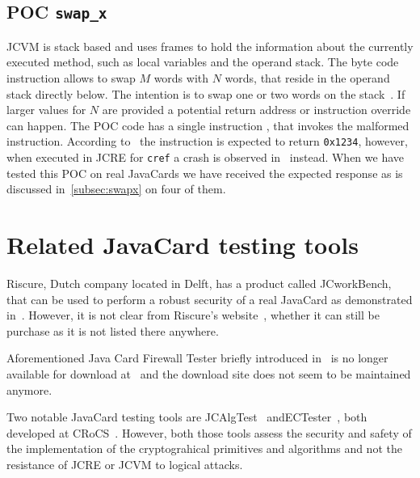 \subsection{POC \texttt{swap_x}}
JCVM is stack based and uses frames to hold the information about the currently executed method, such as local variables and the operand stack. The byte code instruction \swapx allows to swap $M$ words with $N$ words, that reside in the operand stack directly below. The intention is to swap one or two words on the stack~\cite{jcspecs31download}. If larger values for $N$ are provided a potential return address or instruction override can happen.
The POC code has a single instruction \triggerswapx, that invokes the malformed \swapx instruction. According to~\cite{se:oracle:part1} the instruction is expected to return \texttt{0x1234}, however, when executed in JCRE for \texttt{cref} a crash is observed in~\cite{se:oracle:part1} instead. When we have tested this POC on real JavaCards we have received the expected response as is discussed in~\ref{subsec:swapx} on four of them.


\section{Related JavaCard testing tools}
Riscure, Dutch company located in Delft, has a product called JCworkBench, that can be used to perform a robust security of a real JavaCard as demonstrated in~\cite{jcworkbench, riscurejcworkbenchpdf}. However, it is not clear from Riscure's website~\cite{riscureweb}, whether it can still be purchase as it is not listed there anywhere.\footnotemark


Aforementioned Java Card Firewall Tester briefly introduced in~\cite{Mostowski07testingthe} is no longer available for download at~\cite{firewalltester} and the download site does not seem to be maintained anymore.

Two notable JavaCard testing tools are JCAlgTest~\cite{jcalgtest} and\linebreak ECTester~\cite{ectester}, both developed at CRoCS~\cite{crocsweb}. However, both those tools assess the security and safety of the implementation of the cryptograhical primitives and algorithms and not the resistance of JCRE or JCVM to logical attacks.















